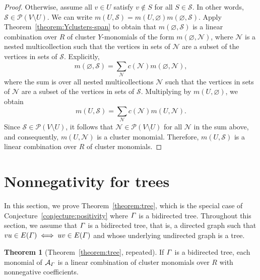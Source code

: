 \documentclass[11pt]{article}
\theoremstyle{definition}
\newtheorem*{theo*}{Theorem}
\numberwithin{equation}{section}
\newcommand{\vertices}{V}
\newcommand{\powerset}[1]{\mathcal{P}(#1)}
\newcommand{\coefficientring}{R}
\newcommand{\graphLPalgebra}[1]{\mathcal{A}_{#1}}
\newcommand{\monomial}[2]{m(#1, #2)}
\begin{document}
\begin{proof}
    Otherwise, assume all \(v \in U\) satisfy \(v \not\in S\) for all \(S \in \mathcal{S}\).
    In other words, \(\mathcal{S} \in \powerset{\vertices \setminus U}\).
    We can write
    \( \monomial{U}{\mathcal{S}} = \monomial{U}{\varnothing} \monomial{\varnothing}{\mathcal{S}} \).
    Apply Theorem~\ref{theorem:Yclusters-span} to obtain that \( \monomial{\varnothing}{\mathcal{S}} \) is a linear combination over \(\coefficientring\) of cluster \(Y\)-monomials of the form \(\monomial{\varnothing}{\mathcal{N}}\), where \(\mathcal{N}\) is a nested multicollection such that the vertices in sets of \(\mathcal{N}\) are a subset of the vertices in sets of \(\mathcal{S}\).
    Explicitly,
    \begin{equation*}
        \monomial{\varnothing}{\mathcal{S}} = \sum_{\mathcal{N}} c(\mathcal{N}) \monomial{\varnothing}{\mathcal{N}},
    \end{equation*}
    where the sum is over all nested multicollections \(\mathcal{N}\) such that the vertices in sets of \(\mathcal{N}\) are a subset of the vertices in sets of \(\mathcal{S}\).
    Multiplying by \(\monomial{U}{\varnothing}\), we obtain
    \begin{equation*}
        \monomial{U}{\mathcal{S}} = \sum_{\mathcal{N}} c(\mathcal{N}) \monomial{U}{\mathcal{N}}.
    \end{equation*}
    Since \(\mathcal{S} \in \powerset{\vertices \setminus U}\), it follows that \(\mathcal{N} \in \powerset{\vertices \setminus U}\) for all \(\mathcal{N}\) in the sum above, and consequently, \(\monomial{U}{\mathcal{N}}\) is a cluster monomial.
    Therefore, \(\monomial{U}{\mathcal{S}}\) is a linear combination over \(\coefficientring\) of cluster monomials.
\end{proof}

\section{Nonnegativity for trees}\label{section:trees}

In this section, we prove Theorem~\ref{theorem:tree}, which is the special case of Conjecture~\ref{conjecture:positivity} where \(\varGamma\) is a bidirected tree.
Throughout this section, we assume that \(\varGamma\) is a bidirected tree,
that is, a directed graph such that \(vu \in E(\varGamma) \iff uv \in E(\varGamma)\) and whose underlying undirected graph is a tree.

\begin{theo*}[Theorem~\ref{theorem:tree}, repeated]
    If \(\varGamma\) is a bidirected tree, each monomial of \(\graphLPalgebra{\graph}\) is a linear combination of cluster monomials over \(\coefficientring\) with nonnegative coefficients.
\end{theo*}
\end{document}
